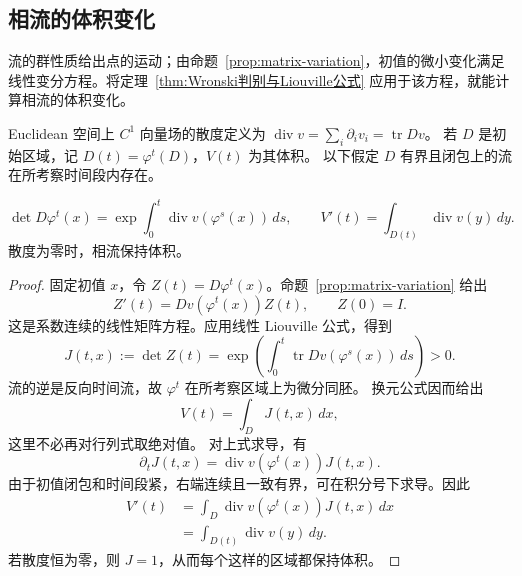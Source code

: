 \subsection*{相流的体积变化}
\label{sec:nonlinear-volume}
流的群性质给出点的运动；由命题~\ref{prop:matrix-variation}，初值的微小变化满足线性变分方程。将定理~\ref{thm:Wronski判别与Liouville公式} 应用于该方程，就能计算相流的体积变化。
\begin{definition}
Euclidean 空间上 $C^1$ 向量场的散度定义为
$\operatorname{div}v=\sum_i\partial_i v_i=\operatorname{tr}Dv$。
若 $D$ 是初始区域，记 $D(t)=\varphi^t(D)$，$V(t)$ 为其体积。
以下假定 $D$ 有界且闭包上的流在所考察时间段内存在。
\end{definition}
\begin{theorem}\label{thm:nonlinear-liouville}
\[
 \det D\varphi^t(x)
 =\exp\int_0^t\operatorname{div}v(\varphi^s(x))\,ds,
 \qquad V'(t)=\int_{D(t)}\operatorname{div}v(y)\,dy.
\]
散度为零时，相流保持体积。
\end{theorem}
\begin{proof}
固定初值 $x$，令 $Z(t)=D\varphi^t(x)$。命题~\ref{prop:matrix-variation} 给出
\[
 Z'(t)=Dv(\varphi^t(x))Z(t),\qquad Z(0)=I.
\]
这是系数连续的线性矩阵方程。应用线性 Liouville 公式，得到
\[
 J(t,x):=\det Z(t)
 =\exp\left(\int_0^t\operatorname{tr}Dv(\varphi^s(x))\,ds\right)>0.
\]
流的逆是反向时间流，故 $\varphi^t$ 在所考察区域上为微分同胚。
换元公式因而给出 
\[
 V(t)=\displaystyle\int_DJ(t,x)\,dx,
\]
这里不必再对行列式取绝对值。
对上式求导，有
\[
 \partial_tJ(t,x)=\operatorname{div}v(\varphi^t(x))J(t,x).
\]
由于初值闭包和时间段紧，右端连续且一致有界，可在积分号下求导。因此
\begin{align*}
 V'(t)&=\int_D\operatorname{div}v(\varphi^t(x))J(t,x)\,dx\\
 &=\int_{D(t)}\operatorname{div}v(y)\,dy.
\end{align*}
若散度恒为零，则 $J=1$，从而每个这样的区域都保持体积。
\end{proof}
